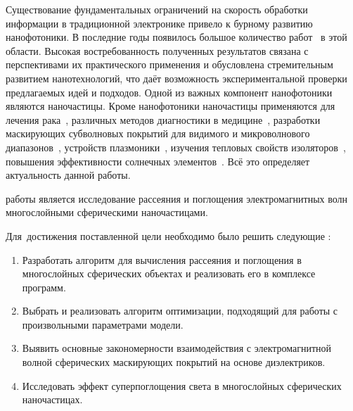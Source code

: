 {\actuality} Существование фундаментальных ограничений на скорость
обработки информации в традиционной электронике привело к бурному
развитию нанофотоники. В последние годы появилось большое количество
работ~\cite{Tame-quantum-plasmonics-2013,
  Javier-graphene-plasmonics-2014, Khurgin-loss-plasmonics-2015,
  He-tunable-terahertz-graphene-metamaterials-2015,
  Segal-meta-nonlinar-PhC-2015,
  Poddubny-hyperbolic-metamaterials-2013, Kildishev-metasurface-2013}
в этой области.  Высокая востребованность полученных результатов
связана с перспективами их практического применения и обусловлена
стремительным развитием нанотехнологий, что даёт возможность
экспериментальной проверки предлагаемых идей и подходов. Одной из
важных компонент нанофотоники являются наночастицы.  Кроме
нанофотоники наночастицы применяются для лечения
рака~\cite{Zhang-2010, Hirsch-2003}, различных методов диагностики в
медицине~\cite{Allain-2002}, разработки маскирующих субволновых
покрытий для видимого и микроволнового диапазонов~\cite{Qui-2009,
  Semouchkina-2013}, устройств плазмоники~\cite{Martin-2013,
  Alu-2005}, изучения тепловых свойств изоляторов~\cite{Xie-2013},
повышения эффективности солнечных элементов~\cite{Kameya-2011,
  Mann-2011}.  Всё это определяет актуальность данной работы.

  
{\aim} работы является %
исследование рассеяния и поглощения электромагнитных волн многослойными
сферическими наночастицами.

Для~достижения поставленной цели необходимо было решить следующие {\tasks}:
\begin{enumerate}
  \item Разработать алгоритм для вычисления рассеяния и поглощения в
    многослойных сферических объектах и реализовать его в комплексе программ.
  \item Выбрать и реализовать алгоритм оптимизации, подходящий для
    работы с произвольными параметрами модели.%
  \item Выявить основные закономерности взаимодействия с
    электромагнитной волной сферических маскирующих покрытий на
    основе диэлектриков.
  \item Исследовать эффект суперпоглощения света в многослойных
    сферических наночастицах.
\end{enumerate}

